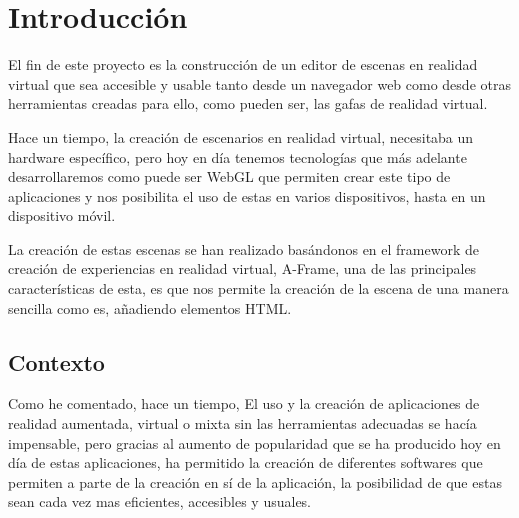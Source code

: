 \documentclass[a4paper, 12pt]{book}
\begin{document}
\tableofcontents 
\cleardoublepage
\listoffigures %




\cleardoublepage
\chapter{Introducción}
\label{sec:intro} %

El fin de este proyecto es la construcción de un editor de escenas en realidad virtual que sea accesible y usable tanto desde un navegador web como desde otras herramientas creadas para ello, como pueden ser, las gafas de realidad virtual.

Hace un tiempo, la creación de escenarios en realidad virtual, necesitaba un hardware específico, pero hoy en día tenemos tecnologías que más adelante desarrollaremos como puede ser WebGL que permiten crear este tipo de aplicaciones y nos posibilita el uso de estas en varios dispositivos, hasta en un dispositivo móvil.

La creación de estas escenas se han realizado basándonos en el framework de creación de experiencias en realidad virtual, A-Frame, una de las principales características de esta, es que nos permite la creación de la escena de una manera sencilla como es, añadiendo elementos HTML. 

\section{Contexto}
\label{sec:contexto}

Como he comentado, hace un tiempo, El uso y la creación de aplicaciones de realidad aumentada, virtual o mixta sin las herramientas adecuadas se hacía impensable, pero gracias al aumento de popularidad que se ha producido hoy en día de estas aplicaciones, ha permitido la creación de diferentes softwares que permiten a parte de la creación en sí de la aplicación, la posibilidad de que estas sean cada vez mas eficientes, accesibles y usuales.
\end{document}
